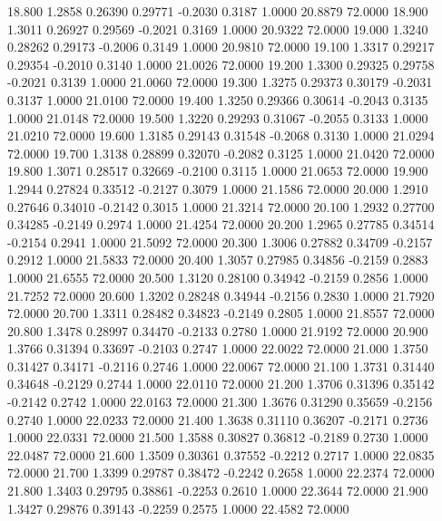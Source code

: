   18.800   1.2858   0.26390   0.29771  -0.2030   0.3187   1.0000  20.8879  72.0000
  18.900   1.3011   0.26927   0.29569  -0.2021   0.3169   1.0000  20.9322  72.0000
  19.000   1.3240   0.28262   0.29173  -0.2006   0.3149   1.0000  20.9810  72.0000
  19.100   1.3317   0.29217   0.29354  -0.2010   0.3140   1.0000  21.0026  72.0000
  19.200   1.3300   0.29325   0.29758  -0.2021   0.3139   1.0000  21.0060  72.0000
  19.300   1.3275   0.29373   0.30179  -0.2031   0.3137   1.0000  21.0100  72.0000
  19.400   1.3250   0.29366   0.30614  -0.2043   0.3135   1.0000  21.0148  72.0000
  19.500   1.3220   0.29293   0.31067  -0.2055   0.3133   1.0000  21.0210  72.0000
  19.600   1.3185   0.29143   0.31548  -0.2068   0.3130   1.0000  21.0294  72.0000
  19.700   1.3138   0.28899   0.32070  -0.2082   0.3125   1.0000  21.0420  72.0000
  19.800   1.3071   0.28517   0.32669  -0.2100   0.3115   1.0000  21.0653  72.0000
  19.900   1.2944   0.27824   0.33512  -0.2127   0.3079   1.0000  21.1586  72.0000
  20.000   1.2910   0.27646   0.34010  -0.2142   0.3015   1.0000  21.3214  72.0000
  20.100   1.2932   0.27700   0.34285  -0.2149   0.2974   1.0000  21.4254  72.0000
  20.200   1.2965   0.27785   0.34514  -0.2154   0.2941   1.0000  21.5092  72.0000
  20.300   1.3006   0.27882   0.34709  -0.2157   0.2912   1.0000  21.5833  72.0000
  20.400   1.3057   0.27985   0.34856  -0.2159   0.2883   1.0000  21.6555  72.0000
  20.500   1.3120   0.28100   0.34942  -0.2159   0.2856   1.0000  21.7252  72.0000
  20.600   1.3202   0.28248   0.34944  -0.2156   0.2830   1.0000  21.7920  72.0000
  20.700   1.3311   0.28482   0.34823  -0.2149   0.2805   1.0000  21.8557  72.0000
  20.800   1.3478   0.28997   0.34470  -0.2133   0.2780   1.0000  21.9192  72.0000
  20.900   1.3766   0.31394   0.33697  -0.2103   0.2747   1.0000  22.0022  72.0000
  21.000   1.3750   0.31427   0.34171  -0.2116   0.2746   1.0000  22.0067  72.0000
  21.100   1.3731   0.31440   0.34648  -0.2129   0.2744   1.0000  22.0110  72.0000
  21.200   1.3706   0.31396   0.35142  -0.2142   0.2742   1.0000  22.0163  72.0000
  21.300   1.3676   0.31290   0.35659  -0.2156   0.2740   1.0000  22.0233  72.0000
  21.400   1.3638   0.31110   0.36207  -0.2171   0.2736   1.0000  22.0331  72.0000
  21.500   1.3588   0.30827   0.36812  -0.2189   0.2730   1.0000  22.0487  72.0000
  21.600   1.3509   0.30361   0.37552  -0.2212   0.2717   1.0000  22.0835  72.0000
  21.700   1.3399   0.29787   0.38472  -0.2242   0.2658   1.0000  22.2374  72.0000
  21.800   1.3403   0.29795   0.38861  -0.2253   0.2610   1.0000  22.3644  72.0000
  21.900   1.3427   0.29876   0.39143  -0.2259   0.2575   1.0000  22.4582  72.0000
